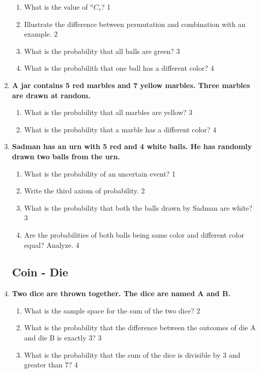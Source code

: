\documentclass[a4paper,oneside, margin=1.4in]{book}
\begin{document}
\begin{enumerate}
  \begin{enumerate}
    \item
	What is the value of $^nC_r$? \hfill 1
    \item
	Illustrate the difference between permutation and combination with an example. \hfill 2
    \item  
	What is the probability that all balls are green? \hfill 3
    \item
	What is the probabilith that one ball has a different color? \hfill 4
  \end{enumerate}
  
  \item
	  \textbf{A jar contains 5 red marbles and 7 yellow marbles. 
	  Three marbles are drawn at random.} 
  
  \begin{enumerate}
    \item  
	What is the probability that all marbles are yellow? \hfill 3
    \item
	What is the probability that a marble has a different color? \hfill 4
  \end{enumerate}


\item
	  \textbf{Sadman has an urn with 5 red and 4 white balls. He has randomly drawn two balls from the urn.} 
  
  \begin{enumerate}
    \item
	What is the probability of an uncertain event? \hfill 1
    \item
	Write the third axiom of probability. \hfill 2
    \item  
	What is the probability that both the balls drawn by Sadman are white? \hfill 3
    \item
	Are the probabilities of both balls being same color and different color equal? Analyze. \hfill 4
  \end{enumerate}
  
  \subsection{Coin - Die}
  
  \item  
  \textbf{Two dice are thrown together. The dice are named A and B.}  

  \begin{enumerate}  
    \item  
    	What is the sample space for the sum of the two dice? \hfill 2  
    \item  
    	What is the probability that the difference between the outcomes of die A and die B is exactly 3? \hfill 3  
    \item  
    	What is the probability that the sum of the dice is divisible by 3 and greater than 7? \hfill 4  
  \end{enumerate}  


\end{enumerate}
\end{document}
